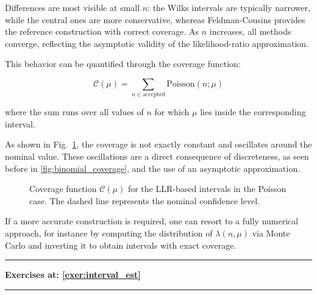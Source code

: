 \begin{example}
	Differences are most visible at small $n$: the Wilks intervals are typically narrower, while the central ones are more conservative, whereas Feldman-Cousins provides the reference construction with correct coverage. As $n$ increases, all methods converge, reflecting the asymptotic validity of the likelihood-ratio approximation.

	This behavior can be quantified through the coverage function:
	
	\[
	\mathcal{C}(\mu) = \sum_{n \in \text{accepted}} \text{Poisson}(n;\mu)
	\]
	
	where the sum runs over all values of $n$ for which $\mu$ lies inside the corresponding interval. 
	
	As shown in Fig.~\ref{fig:llr_poisson_coverage}, the coverage is not exactly constant and oscillates around the nominal value. These oscillations are a direct consequence of discreteness, as seen before in \ref{fig:binomial_coverage}, and the use of an asymptotic approximation.
	
	\begin{figure}[H]
		\centering
		
		\caption{Coverage function $\mathcal{C}(\mu)$ for the LLR-based intervals in the Poisson case. The dashed line represents the nominal confidence level.}
		\label{fig:llr_poisson_coverage}
	\end{figure}
	
	If a more accurate construction is required, one can resort to a fully numerical approach, for instance by computing the distribution of $\lambda(n,\mu)$ via Monte Carlo and inverting it to obtain intervals with exact coverage.
\end{example}

\vspace*{1cm}
\hrule
\begin{center}
	\textbf{Exercises at: \ref{exer:interval_est}}
\end{center}
\hrule